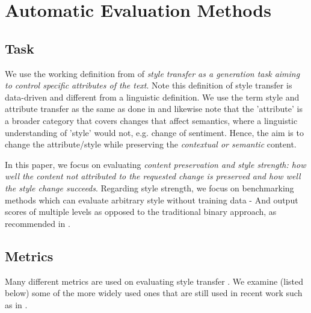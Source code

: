
\section{Automatic Evaluation Methods}
\subsection{Task}
We use the working definition from \citet{ jin-etal-2022-deep} of \textit{style transfer as a generation task aiming to control specific attributes of the text}. Note this definition of style transfer is data-driven and different from a linguistic definition. We use the term style and attribute transfer as the same as done in \citet{ jin-etal-2022-deep} and likewise note that the 'attribute' is a broader category that covers changes that affect semantics, where a linguistic understanding of 'style' would not, e.g. change of sentiment. Hence, the aim is to change the attribute/style while preserving the \textit{contextual or semantic} content. 

In this paper, we focus on evaluating \emph{content preservation and style strength: how well the content not attributed to the requested change is preserved and how well the style change succeeds}. Regarding style strength, we focus on benchmarking methods which can evaluate arbitrary style without training data - And output scores of multiple levels as opposed to the traditional binary approach, as recommended in \citet{briakou-etal-2021-evaluating}.  
\subsection{Metrics}
Many different metrics are used on evaluating style transfer \cite{ostheimer-etal-2023-call}. We examine (listed below) some of the more widely used ones that are still used in recent work such as in \citet{lai-etal-2024-style,hallinan-etal-2023-steer,han-etal-2024-disentangled,mukherjee-etal-2024-large-language,liu2024adaptive,zhang-etal-2024-distilling,luo-etal-2023-prompt,zeng2024bat}.

